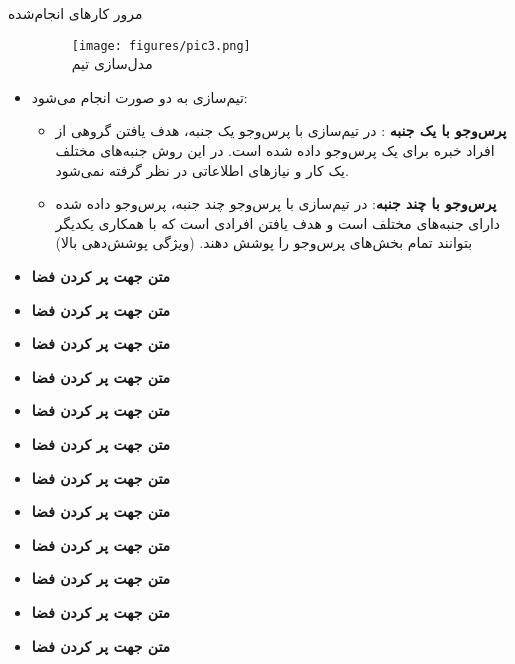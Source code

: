 \documentclass[final,hyperref={pdfpagelabels=false}]{beamer}
\begin{document}
\begin{frame}[t]
\begin{columns}[t]
\begin{column}{.465\textwidth}
\begin{block}{مرور کار‌های انجام‌شده}
\begin{itemize}
\begin{figure}
\centering
\texttt{[image: figures/pic3.png]}
\\{\small مدل‌سازی تیم }
\end{figure}


\item
تیم‌سازی به دو صورت انجام می‌شود:
\begin{itemize}
\item \textbf{پرس‌‌و‌‌جو با یک جنبه
}: در تیم‌سازی با پرس‌و‌جو یک جنبه، هدف یافتن گروهی از افراد خبره برای یک پرس‌و‌جو داده شده است. در این روش جنبه‌های مختلف یک کار و نیاز‌های اطلاعاتی در نظر گرفته نمی‌شود.

\item  \textbf{پرس‌‌و‌‌جو با چند جنبه}: در تیم‌سازی با پرس‌و‌جو چند جنبه، پرس‌و‌جو داده شده دارای جنبه‌‌های مختلف است و هدف یافتن افرادی است که با همکاری یکدیگر بتوانند تمام بخش‌های پرس‌و‌جو را پوشش دهند. (ویژگی پوشش‌دهی بالا)

\end{itemize}


\item {\textbf{متن جهت پر کردن فضا}}
\item {\textbf{متن جهت پر کردن فضا}}
\item {\textbf{متن جهت پر کردن فضا}}
\item {\textbf{متن جهت پر کردن فضا}}
\item {\textbf{متن جهت پر کردن فضا}}
\item {\textbf{متن جهت پر کردن فضا}}
\item {\textbf{متن جهت پر کردن فضا}}
\item {\textbf{متن جهت پر کردن فضا}}
\item {\textbf{متن جهت پر کردن فضا}}
\item {\textbf{متن جهت پر کردن فضا}}
\item {\textbf{متن جهت پر کردن فضا}}
\item {\textbf{متن جهت پر کردن فضا}}

\end{itemize}
\end{block}






\end{column}
\end{columns}
\end{frame}
\end{document}
